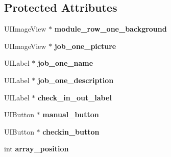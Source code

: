 \subsection*{\-Protected \-Attributes}
\begin{DoxyCompactItemize}
\item 
\hypertarget{interface_my_job_display_cell_abea47450881d5d77f9b4f3eb8a17bc3c}{
\-U\-I\-Image\-View $\ast$ {\bfseries module\-\_\-row\-\_\-one\-\_\-background}}
\label{interface_my_job_display_cell_abea47450881d5d77f9b4f3eb8a17bc3c}

\item 
\hypertarget{interface_my_job_display_cell_a7b98ac294d75ef344ba20d7191c05b72}{
\-U\-I\-Image\-View $\ast$ {\bfseries job\-\_\-one\-\_\-picture}}
\label{interface_my_job_display_cell_a7b98ac294d75ef344ba20d7191c05b72}

\item 
\hypertarget{interface_my_job_display_cell_a9cd9e7c51e035f9e9a52c56aba6e6795}{
\-U\-I\-Label $\ast$ {\bfseries job\-\_\-one\-\_\-name}}
\label{interface_my_job_display_cell_a9cd9e7c51e035f9e9a52c56aba6e6795}

\item 
\hypertarget{interface_my_job_display_cell_a329a43c5d697c70f1500f0f6f378e02e}{
\-U\-I\-Label $\ast$ {\bfseries job\-\_\-one\-\_\-description}}
\label{interface_my_job_display_cell_a329a43c5d697c70f1500f0f6f378e02e}

\item 
\hypertarget{interface_my_job_display_cell_a5d449613372afedd53619ddbf3a8274c}{
\-U\-I\-Label $\ast$ {\bfseries check\-\_\-in\-\_\-out\-\_\-label}}
\label{interface_my_job_display_cell_a5d449613372afedd53619ddbf3a8274c}

\item 
\hypertarget{interface_my_job_display_cell_ae22852e6fc009b37f1bece2205539e36}{
\-U\-I\-Button $\ast$ {\bfseries manual\-\_\-button}}
\label{interface_my_job_display_cell_ae22852e6fc009b37f1bece2205539e36}

\item 
\hypertarget{interface_my_job_display_cell_ae59a6d25135a2692e07aa3c383b076af}{
\-U\-I\-Button $\ast$ {\bfseries checkin\-\_\-button}}
\label{interface_my_job_display_cell_ae59a6d25135a2692e07aa3c383b076af}

\item 
\hypertarget{interface_my_job_display_cell_a5f1b313562ae68464e42a48030e01fc8}{
int {\bfseries array\-\_\-position}}
\label{interface_my_job_display_cell_a5f1b313562ae68464e42a48030e01fc8}


\end{DoxyCompactItemize}
